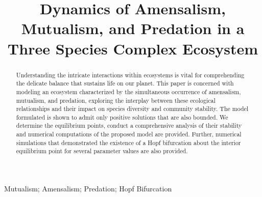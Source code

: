 \documentclass[]{interact}
\theoremstyle{plain}%
\theoremstyle{definition}
\theoremstyle{remark}
\numberwithin{equation}{section}
\begin{document}
\articletype{}%

\title{Dynamics of Amensalism, Mutualism, and Predation in a Three Species Complex Ecosystem}

\author{
}

\maketitle

\begin{abstract}
    Understanding the intricate interactions within ecosystems is vital for comprehending the delicate balance that sustains life on our planet.
    This paper is concerned with modeling an ecosystem characterized by the simultaneous occurrence of amensalism, mutualism, and predation, exploring the interplay between these ecological relationships and their impact on species diversity and community stability.
    The model formulated is shown to admit only positive solutions that are also bounded.
    We determine the equilibrium points, conduct a comprehensive analysis of their stability and numerical computations of the proposed model are provided.
    Further, numerical simulations that demonstrated the existence of a Hopf bifurcation about the interior equilibrium point for several parameter values are also provided.
\end{abstract}

\begin{keywords}
Mutualism; Amensalism; Predation; Hopf Bifurcation
\end{keywords}

% 
% 
% 
% 
% 

\end{document}
